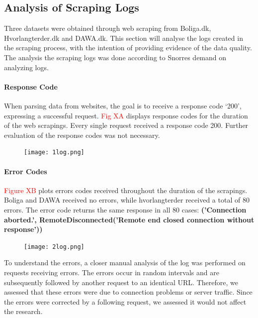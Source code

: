 \documentclass[12pt,a4paper]{article}
\begin{document}
\subsection{Analysis of Scraping Logs}
Three datasets were obtained through web scraping from Boliga.dk, Hvorlangterder.dk and DAWA.dk. This section will analyse the logs created in the scraping process, with the intention of providing evidence of the data quality. The analysis the scraping logs was done according to Snorres demand on analyzing logs. 
\paragraph{Response Code\newline}
When parsing data from websites, the goal is to receive a response code ‘200’, expressing a successful request. \textcolor{red}{Fig XA} displays response codes for the duration of the web scrapings. Every single request received a response code 200. Further evaluation of the response codes was not necessary.
\begin{figure}[H]
  \centering
   \caption{}
   \texttt{[image: 1log.png]} 
  \label{fig:}
\end{figure}

\paragraph{Error Codes\newline}
\textcolor{red}{Figure XB} plots errors codes received throughout the duration of the scrapings. Boliga and DAWA received no errors, while hvorlangterder received a total of 80 errors. The error code returns the same response in all 80 cases: \small{\textbf{('Connection aborted.', RemoteDisconnected('Remote end closed connection without response'))}}
\begin{figure}[H]
  \centering
   \caption{}
   \texttt{[image: 2log.png]} 
  \label{fig:}
\end{figure}
To understand the errors, a closer manual analysis of the log was performed on requests receiving errors. The errors occur in random intervals and are subsequently followed by another request to an identical URL. Therefore, we assessed that these errors were due to connection problems or server traffic. Since the errors were corrected by a following request, we assessed it would not affect the research.
\end{document}
